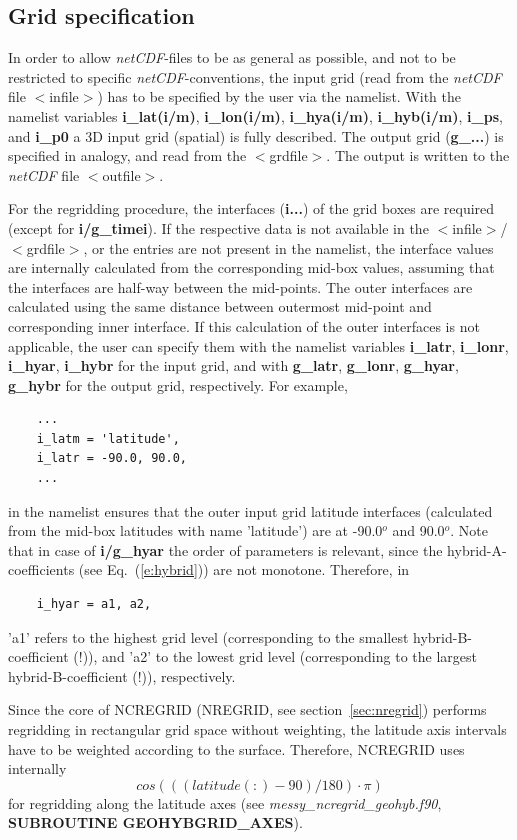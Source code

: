 \documentclass[12pt, a4paper]{article}
\begin{document}
\subsection{Grid specification}
\label{sec:grid}
In order to allow {\it netCDF}-files to be as general as possible,
and not to be restricted to specific {\it netCDF}-conventions,
the input grid (read from the {\it netCDF} file $<$infile$>$) has to be
specified by the user via the namelist.
With the namelist variables {\bf i\_lat(i/m)}, {\bf i\_lon(i/m)},
{\bf i\_hya(i/m)}, {\bf i\_hyb(i/m)}, {\bf i\_ps}, and {\bf i\_p0}
a 3D input grid (spatial) is fully described.
The output grid ({\bf g\_...}) is specified in analogy, and read from the
$<$grdfile$>$. The output is written to the {\it netCDF} file
$<$outfile$>$.
%

For the regridding procedure,
the interfaces ({\bf i...}) of the grid boxes are required (except for
{\bf i/g\_timei}).
If the respective data is not available in the $<$infile$>$/$<$grdfile$>$,
or the entries are not present in the namelist, the interface values are
internally calculated from the corresponding mid-box values,
assuming that the interfaces are half-way between the mid-points.
The outer interfaces are calculated using the same distance
between outermost mid-point and corresponding inner interface.
If this calculation of the outer interfaces is not applicable, the user
can specify them with the namelist variables {\bf i\_latr}, {\bf i\_lonr},
{\bf i\_hyar}, {\bf i\_hybr} for the input grid, and with
{\bf g\_latr}, {\bf g\_lonr}, {\bf g\_hyar}, {\bf g\_hybr} for the output grid,
respectively.
For example,
\begin{verbatim}
    ...
    i_latm = 'latitude',
    i_latr = -90.0, 90.0,
    ...
\end{verbatim}
in the namelist ensures that the outer input grid
latitude interfaces (calculated from the mid-box latitudes with name
'latitude') are at -90.0$^o$ and 90.0$^o$.
Note that in case of {\bf i/g\_hyar} the order of parameters is relevant,
since the hybrid-A-coefficients (see Eq.~(\ref{e:hybrid})) are not
monotone. Therefore, in
\begin{verbatim}
    i_hyar = a1, a2,
\end{verbatim}
'a1' refers to the highest grid level (corresponding to the smallest
hybrid-B-coefficient (!)), and 'a2' to the lowest grid level (corresponding to
the largest hybrid-B-coefficient (!)), respectively.

Since the core of NCREGRID (NREGRID, see section~\ref{sec:nregrid})
performs regridding in rectangular grid space without weighting,
the latitude axis intervals have to be weighted according to the surface.
Therefore, NCREGRID uses internally 
\begin{equation}
  \label{e:latitude}
  cos(((latitude(:) - 90)/180) \cdot \pi)
\end{equation}
for regridding along the latitude axes (see {\it messy\_ncregrid\_geohyb.f90},
{\bf SUBROUTINE GEOHYBGRID\_AXES}).
\end{document}
